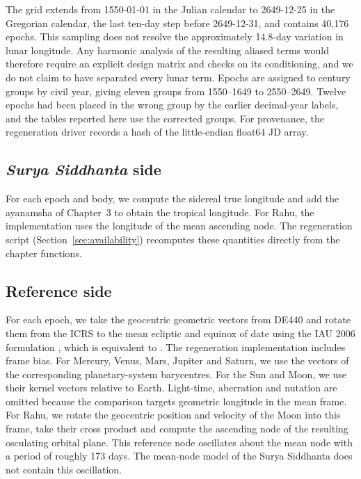\documentclass[11pt,a4paper]{article}
\begin{document}
The grid extends from 1550-01-01 in the Julian calendar to 2649-12-25 in the Gregorian calendar, the last ten-day step before 2649-12-31, and contains 40,176 epochs. This sampling does not resolve the approximately 14.8-day variation in lunar longitude. Any harmonic analysis of the resulting aliased terms would therefore require an explicit design matrix and checks on its conditioning, and we do not claim to have separated every lunar term. Epochs are assigned to century groups by civil year, giving eleven groups from 1550--1649 to 2550--2649. Twelve epochs had been placed in the wrong group by the earlier decimal-year labels, and the tables reported here use the corrected groups. For provenance, the regeneration driver records a hash of the little-endian float64 JD array.

\subsection{\textit{Surya Siddhanta} side}

For each epoch and body, we compute the sidereal true longitude and add the ayanamsha of Chapter~3 to obtain the tropical longitude. For Rahu, the implementation uses the longitude of the mean ascending node. The regeneration script (Section~\ref{sec:availability}) recomputes these quantities directly from the chapter functions.

\subsection{Reference side}
\label{sec:reference}

For each epoch, we take the geocentric geometric vectors from DE440 and rotate them from the ICRS to the mean ecliptic and equinox of date using the IAU 2006 formulation \citep{capitaine2003,hilton2006}, which is equivalent to . The regeneration implementation includes frame bias. For Mercury, Venus, Mars, Jupiter and Saturn, we use the vectors of the corresponding planetary-system barycentres. For the Sun and Moon, we use their kernel vectors relative to Earth. Light-time, aberration and nutation are omitted because the comparison targets geometric longitude in the mean frame. For Rahu, we rotate the geocentric position and velocity of the Moon into this frame, take their cross product and compute the ascending node of the resulting osculating orbital plane. This reference node oscillates about the mean node with a period of roughly 173 days. The mean-node model of the Surya Siddhanta does not contain this oscillation.
\end{document}
